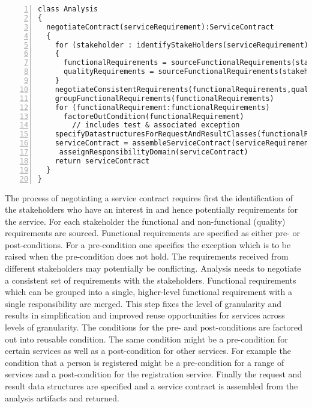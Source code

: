 \lstset{language=pseudoCode,caption=The analysis phase of the URDAD process.,label=urdadAnalysis}
\begin{lstlisting}[numbers=left,escapechar=|]
class Analysis
{
  negotiateContract(serviceRequirement):ServiceContract
  {
    for (stakeholder : identifyStakeHolders(serviceRequirement))
    {
      functionalRequirements = sourceFunctionalRequirements(stakeholder, serviceRequirement)
      qualityRequirements = sourceFunctionalRequirements(stakeholder, serviceRequirement)
    }
    negotiateConsistentRequirements(functionalRequirements,qualityRequirements)
    groupFunctionalRequirements(functionalRequirements)
    for (functionalRequirement:functionalRequirements)
      factoreOutCondition(functionalRequirement)
        // includes test & associated exception
    specifyDatastructuresForRequestAndResultClasses(functionalRequirements)
    serviceContract = assembleServiceContract(serviceRequirement.serviceName, serviceRequirement.responsibilityDomain, functionalRequirements, qualityRequirements, requestClass, resultClass);
	 asseignResponsibilityDomain(serviceContract)
    return serviceContract
  }
}
\end{lstlisting}

The process of negotiating a service contract requires first the identification of the stakeholders who have an interest in and hence potentially requirements for the service. For each stakeholder the functional and non-functional (quality) requirements are sourced. Functional requirements are specified as either pre- or post-conditions. For a pre-condition one specifies the exception which is to be raised when the pre-condition does not hold. The requirements received from different stakeholders may potentially be conflicting. Analysis needs to negotiate a consistent set of requirements with the stakeholders. Functional requirements which can be grouped into a single, higher-level functional requirement with a single responsibility are merged. This step fixes the level of granularity and results in simplification and improved reuse opportunities for services across levels of granularity. The conditions for the pre- and post-conditions are factored out into reusable condition. The same condition might be a pre-condition for certain services as well as a post-condition for other services. For example the condition that a person is registered might be a pre-condition for a range of services and a post-condition for the registration service. Finally the request and result data structures are specified and a service contract is assembled from the analysis artifacts and returned.


